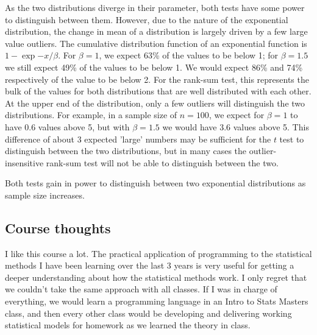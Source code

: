 \documentclass{article}
\begin{document}
As the two distributions diverge in their parameter, both tests have some power to distinguish between them. However, due to the nature of the exponential distribution, the change in mean of a distribution is largely driven by a few large value outliers. The cumulative distribution function of an exponential function is $1-\exp{-x/\beta}$. For $\beta= 1$, we expect 63\% of the values to be below 1; for $\beta = 1.5$ we still expect 49\% of the values to be below 1. We would expect 86\% and 74\% respectively of the value to be below 2. For the rank-sum test, this represents the bulk of the values for both distributions that are well distributed with each other. At the upper end of the distribution, only a few outliers will distinguish the two distributions. For example, in a sample size of $n=100$, we expect for $\beta=1$ to have 0.6 values above 5, but with $\beta=1.5$ we would have 3.6 values above 5. This difference of about 3 expected 'large' numbers may be sufficient for the $t$ test to distinguish between the two distributions, but in many cases the outlier-insensitive rank-sum test will not be able to distinguish between the two.

Both tests gain in power to distinguish between two exponential distributions as sample size increases. 

\subsection*{Course thoughts}

I like this course a lot. The practical application of programming to the statistical methods I have been learning over the last 3 years is very useful for getting a deeper understanding about how the statistical methods work. I only regret that we couldn't take the same approach with all classes. If I was in charge of everything, we would learn a programming language in an Intro to Stats Masters class, and then every other class would be developing and delivering working statistical models for homework as we learned the theory in class. 
\end{document}
